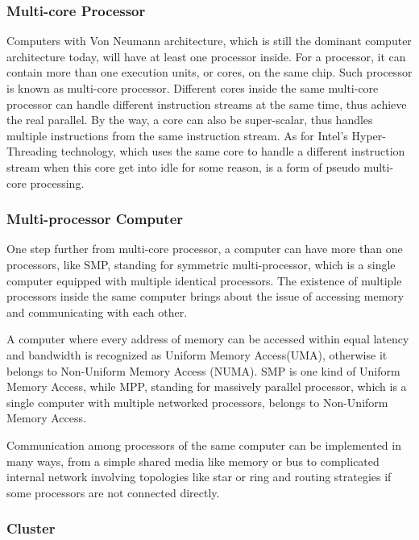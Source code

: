 \documentclass[12pt,a4paper]{report}
\begin{document}
\subsubsection{Multi-core Processor}

Computers with Von Neumann architecture, which is still the dominant computer architecture today, will have at least one processor inside. For a processor, it can contain more than one execution units, or cores, on the same chip. Such processor is known as multi-core processor. Different cores inside the same multi-core processor can handle different instruction streams at the same time, thus achieve the real parallel. By the way, a core can also be super-scalar, thus handles multiple instructions from the same instruction stream. As for Intel's Hyper-Threading technology, which uses the same core to handle a different instruction stream when this core get into idle for some reason, is a form of pseudo multi-core processing.

\subsubsection{Multi-processor Computer}

One step further from multi-core processor, a computer can have more than one processors, like SMP, standing for symmetric multi-processor, which is a single computer equipped with multiple identical processors. The existence of multiple processors inside the same computer brings about the issue of accessing memory and communicating with each other.

A computer where every address of memory can be accessed within equal latency and bandwidth is recognized as Uniform Memory Access(UMA), otherwise it belongs to Non-Uniform Memory Access (NUMA). SMP is one kind of Uniform Memory Access, while MPP, standing for massively parallel processor, which is a single computer with multiple networked processors, belongs to Non-Uniform Memory Access.

Communication among processors of the same computer can be implemented in many ways, from a simple shared media like memory or bus to complicated internal network involving topologies like star or ring and routing strategies if some processors are not connected directly.

\subsubsection{Cluster}
\end{document}
